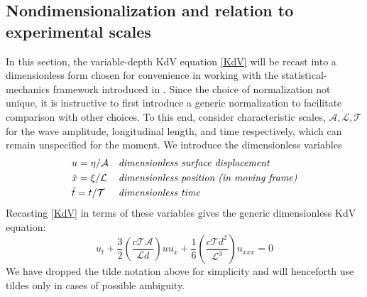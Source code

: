 \documentclass[11pt]{article}
\newcommand{\depth}{d}
\newcommand{\ampscale}{\mathcal{A}}
\newcommand{\lengthscale}{\mathcal{L}}
\newcommand{\timescale}{\mathcal{T}}
\begin{document}
\subsection{Nondimensionalization and relation to experimental scales}

In this section, the variable-depth KdV equation \eqref{KdV} will be recast into a dimensionless form chosen for convenience in working with the statistical-mechanics framework introduced in \cite{majda2019}. Since the choice of normalization not unique, it is instructive to first introduce a generic normalization to facilitate comparison with other choices. To this end, consider characteristic scales, $\ampscale, \lengthscale, \timescale$ for the wave amplitude, longitudinal length, and time respectively, which can remain unspecified for the moment. We introduce the dimensionless variables
\begin{align}
&u = \eta / \ampscale
&&\mbox{\em dimensionless surface displacement} \\
&\tilde{x} = \xi / \lengthscale
&&\mbox{\em dimensionless position (in moving frame)} \\
&\tilde{t} = t / \timescale
&&\mbox{\em dimensionless time}
\end{align}
Recasting \eqref{KdV} in terms of these variables gives the generic dimensionless KdV equation:
\begin{equation}
u_t + \frac{3}{2} \left( \frac{c \timescale \ampscale}{\lengthscale \depth} \right) u u_x 
+ \frac{1}{6} \left( \frac{c \timescale \depth^2}{\lengthscale^3} \right) u_{xxx} = 0
\end{equation}
We have dropped the tilde notation above for simplicity and will henceforth use tildes only in cases of possible ambiguity.
\end{document}
